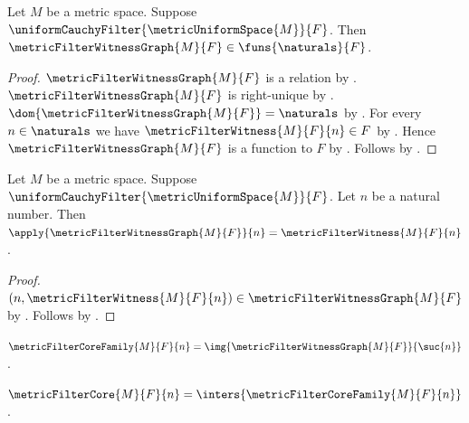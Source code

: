\begin{proposition}\label{metric_filter_witness_graph_type}
    Let $M$ be a metric space.
    Suppose $\uniformCauchyFilter{\metricUniformSpace{M}}{F}$.
    Then $\metricFilterWitnessGraph{M}{F}\in\funs{\naturals}{F}$.
\end{proposition}
\begin{proof}
    $\metricFilterWitnessGraph{M}{F}$ is a relation
        by .
    $\metricFilterWitnessGraph{M}{F}$ is right-unique
        by .
    $\dom{\metricFilterWitnessGraph{M}{F}}=\naturals$
        by .
    For every $n\in\naturals$ we have
        $\metricFilterWitness{M}{F}{n}\in F$
        by .
    Hence $\metricFilterWitnessGraph{M}{F}$ is a function to $F$
        by .
    Follows by .
\end{proof}

\begin{proposition}\label{metric_filter_witness_graph_application}
    Let $M$ be a metric space.
    Suppose $\uniformCauchyFilter{\metricUniformSpace{M}}{F}$.
    Let $n$ be a natural number.
    Then
        $\apply{\metricFilterWitnessGraph{M}{F}}{n}
            =\metricFilterWitness{M}{F}{n}$.
\end{proposition}
\begin{proof}
    $(n,\metricFilterWitness{M}{F}{n})
        \in\metricFilterWitnessGraph{M}{F}$
        by .
    Follows by
        .
\end{proof}

\begin{definition}\label{metric_filter_core_family}
    $\metricFilterCoreFamily{M}{F}{n}=
        \img{\metricFilterWitnessGraph{M}{F}}{\suc{n}}$.
\end{definition}

\begin{definition}\label{metric_filter_core}
    $\metricFilterCore{M}{F}{n}=
        \inters{\metricFilterCoreFamily{M}{F}{n}}$.
\end{definition}

